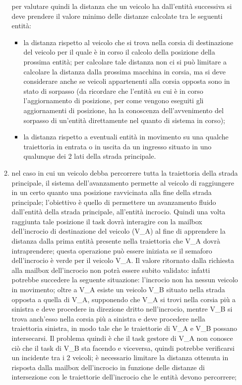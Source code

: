 \begin{enumerate}
\begin{enumerate}
per valutare quindi la distanza che un veicolo ha dall'entità successiva si deve prendere il valore minimo delle distanze calcolate tra le seguenti entità:
\begin{itemize}
\item la distanza rispetto al veicolo che si trova nella corsia di destinazione del veicolo per il quale è in corso il calcolo della posizione della prossima entità; per calcolare tale distanza non ci si può limitare a calcolare la distanza dalla prossima macchina in corsia, ma si deve considerare anche se veicoli appartenenti alla corsia opposta sono in stato di sorpasso (da ricordare che l'entità su cui è in corso l'aggiornamento di posizione, per come vengono eseguiti gli aggiornamenti di posizione, ha la conoscenza dell'avvenimento del sorpasso di un'entità direttamente nel quanto di sistema in corso);
\item la distanza rispetto a eventuali entità in movimento su una qualche traiettoria in entrata o in uscita da un ingresso situato in uno qualunque dei 2 lati della strada principale. 
\end{itemize}
\item nel caso in cui un veicolo debba percorrere tutta la traiettoria della strada principale, il sistema dell'avanzamento permette al veicolo di raggiungere in un certo quanto una posizione ravvicinata alla fine della strada principale; l'obiettivo è quello di permettere un avanzamento fluido dall'entità della strada principale, all'entità incrocio. Quindi una volta raggiunta tale posizione il task dovrà interagire con la mailbox dell'incrocio di destinazione del veicolo (V\_A) al fine di apprendere la distanza dalla prima entità presente nella traiettoria che V\_A dovrà intraprendere; questa operazione può essere iniziata se il semaforo dell'incrocio è verde per il veicolo V\_A. Il valore ritornato dalla richiesta alla mailbox dell'incrocio non potrà essere subito validato: infatti potrebbe succedere la seguente situazione: l'incrocio non ha nessun veicolo in movimento; oltre a V\_A esiste un veicolo V\_B situato nella strada opposta a quella di V\_A, supponendo che V\_A si trovi nella corsia più a sinistra e deve procedere in direzione dritto nell'incrocio, mentre V\_B si trova anch'esso nella corsia più a sinistra e deve procedere nella traiettoria sinistra, in modo tale che le traiettorie di V\_A e V\_B possano intersecarsi. Il problema quindi è che il task gestore di V\_A non conosce ciò che il task di V\_B sta facendo e viceversa, quindi potrebbe verificarsi un incidente tra i 2 veicoli; è necessario limitare la distanza ottenuta in risposta dalla mailbox dell'incrocio in funzione delle distanze di intersezione con le traiettorie dell'incrocio che le entità devono percorrere;

\end{enumerate}
\end{enumerate}
